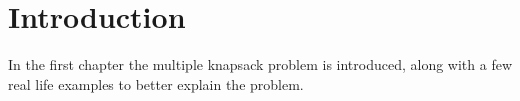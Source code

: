 \chapter{Introduction}

In the first chapter the multiple knapsack problem is introduced,
along with a few real life examples to better explain the problem.


